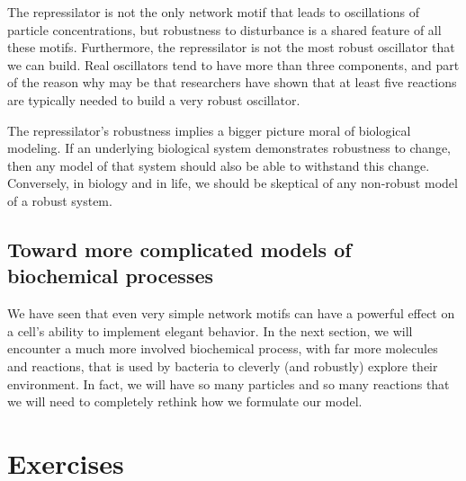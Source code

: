 The repressilator is not the only network motif that leads to oscillations of particle concentrations, but robustness to disturbance is a shared feature of all these motifs. Furthermore, the repressilator is not the most robust oscillator that we can build. Real oscillators tend to have more than three components, and part of the reason why may be that researchers have shown that at least five reactions are typically needed to build a very robust oscillator.

The repressilator's robustness implies a bigger picture moral of biological modeling. If an underlying biological system demonstrates robustness to change, then any model of that system should also be able to withstand this change. Conversely, in biology and in life, we should be skeptical of any non-robust model of a robust system.

\FloatBarrier
{}
\subsection{Toward more complicated models of biochemical processes}

We have seen that even very simple network motifs can have a powerful effect on a cell's ability to implement elegant behavior. In the next section, we will encounter a much more involved biochemical process, with far more molecules and reactions, that is used by bacteria to cleverly (and robustly) explore their environment. In fact, we will have so many particles and so many reactions that we will need to completely rethink how we formulate our model.

\FloatBarrier
\section{Exercises}
\label{sec:exercises}

\begin{exercise}\end{exercise}
